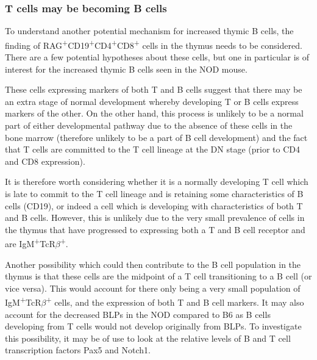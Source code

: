 \subsubsection{T cells may be becoming B cells}

To understand another potential mechanism for increased thymic B cells, the finding of RAG\textsuperscript{+}CD19\textsuperscript{+}CD4\textsuperscript{+}CD8\textsuperscript{+} cells in the thymus needs to be considered.
There are a few potential hypotheses about these cells, but one in particular is of interest for the increased thymic B cells seen in the NOD mouse.

These cells expressing markers of both T and B cells suggest that there may be an extra stage of normal development whereby developing T or B cells express markers of the other.
On the other hand, this process is unlikely to be a normal part of either developmental pathway due to the absence of these cells in the bone marrow (therefore unlikely to be a part of B cell development) and the fact that T cells are committed to the T cell lineage at the DN stage (prior to CD4 and CD8 expression).

It is therefore worth considering whether it is a normally developing T cell which is late to commit to the T cell lineage and is retaining some characteristics of B cells (CD19), or indeed a cell which is developing with characteristics of both T and B cells.
However, this is unlikely due to the very small prevalence of cells in the thymus that have progressed to expressing both a T and B cell receptor and are IgM\textsuperscript{+}TcR$\beta$\textsuperscript{+}.

Another possibility which could then contribute to the B cell population in the thymus is that these cells are the midpoint of a T cell transitioning to a B cell (or vice versa).
This would account for there only being a very small population of IgM\textsuperscript{+}TcR$\beta$\textsuperscript{+} cells, and the expression of both T and B cell markers.
It may also account for the decreased BLPs in the NOD compared to B6 as B cells developing from T cells would not develop originally from BLPs.
To investigate this possibility, it may be of use to look at the relative levels of B and T cell transcription factors Pax5 and Notch1.

